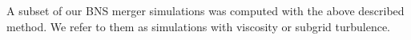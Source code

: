 A subset of our \ac{BNS} merger simulations was computed 
with the above described method. 
We refer to them as simulations with viscosity or subgrid turbulence. 


%










